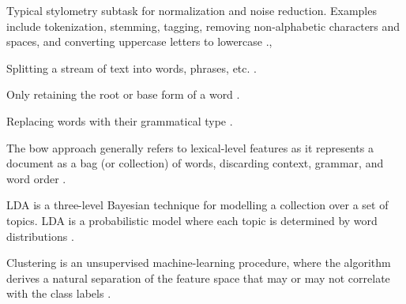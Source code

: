 \begin{definition}
    Typical stylometry subtask for normalization and noise reduction.
    Examples include tokenization, stemming, tagging, removing non-alphabetic characters and spaces, and converting uppercase letters to lowercase \cite{neal_surveying_2018}.,
\end{definition}

\begin{definition}
    [Tokenization]
    Splitting a stream of text into words, phrases, etc. \cite{neal_surveying_2018}.
\end{definition}

\begin{definition}
    [Stemming]
    Only retaining the root or base form of a word \cite{neal_surveying_2018}.
\end{definition}

\begin{definition}
    [Tagging]
    Replacing words with their grammatical type \cite{neal_surveying_2018}.
\end{definition}

\begin{definition}
    [\ac{bow}]
    The \ac{bow} approach generally refers to lexical-level features as it represents a document as a bag (or collection) of words, 
    discarding context, grammar, and word order \cite{neal_surveying_2018}.
\end{definition}

\begin{definition}
    LDA is a three-level Bayesian technique for modelling a collection over a set of topics.
    LDA is a probabilistic model where each topic is determined by word distributions \cite{neal_surveying_2018}.
\end{definition}

\begin{definition}
    [Clustering]
    Clustering is an unsupervised machine-learning procedure, where the algorithm derives a natural separation of the feature space 
    that may or may not correlate with the class labels \cite{neal_surveying_2018}.
\end{definition}
